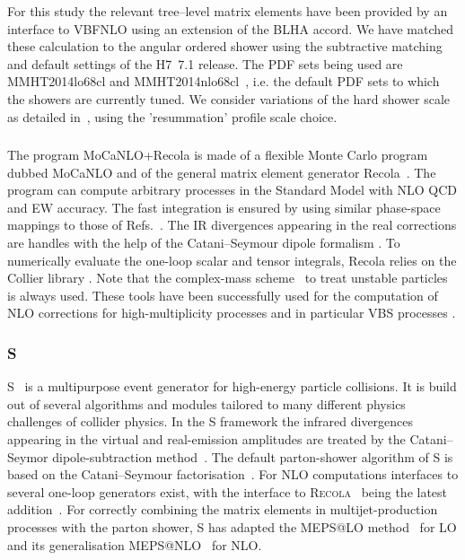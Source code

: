 \documentclass[11pt]{cernrep}
\newcommand{\Sherpa}{S\protect\scalebox{0.8}{HERPA}\xspace}
\newcommand{\Herwig}{H\protect\scalebox{0.8}{ERWIG}7\xspace}
\newcommand{\MoCaNLO}{M\protect\scalebox{0.8}{oCaNLO}\xspace}
\newcommand{\Recola}{R\protect\scalebox{0.8}{ecola}\xspace}
\begin{document}
For this study the relevant tree--level matrix elements have been
provided by an interface to VBFNLO using an extension of the BLHA
accord. We have matched these calculation to the angular ordered
shower using the subtractive matching and default settings of the
\Herwig~7.1 release. The PDF sets being used are MMHT2014lo68cl and
MMHT2014nlo68cl~\cite{Harland-Lang:2014zoa}, i.e. the default PDF sets
to which the showers are currently tuned. We consider variations of
the hard shower scale as detailed in~\cite{Bellm:2016rhh}, using the
'resummation' profile scale choice.

\subsubsection*{\protect{\MoCaNLO\!+\Recola} \label{vbs_MoCaNLO_Recola}}

The program {\sc MoCaNLO+Recola} is made of a flexible Monte Carlo program dubbed {\sc MoCaNLO} and of the general matrix element generator {\sc Recola}~\cite{Actis:2012qn,Actis:2016mpe}.
The program can compute arbitrary processes in the Standard Model with NLO QCD and EW accuracy.
The fast integration is ensured by using similar phase-space mappings to those of Refs.~\cite{Berends:1994pv,Denner:1999gp,Dittmaier:2002ap}.
The IR divergences appearing in the real corrections are handles with the help of the Catani--Seymour dipole formalism \cite{Catani:1996vz,Dittmaier:1999mb}.
To numerically evaluate the one-loop scalar and tensor integrals, {\sc Recola} relies on the {\sc Collier} library \cite{Denner:2014gla,Denner:2016kdg}.
Note that the complex-mass scheme~\cite{Denner:1999gp,Denner:2005fg} to treat unstable particles is always used.
These tools have been successfully used for the computation of NLO corrections for high-multiplicity processes and in particular VBS processes \cite{Biedermann:2016yds,Biedermann:2017bss}.

\subsubsection*{\protect\Sherpa \label{vbs_sherpa}}
\Sherpa~\cite{Gleisberg:2008ta,Gleisberg:2003xi} is a multipurpose event generator for high-energy particle collisions. 
It is build out of several algorithms and modules tailored to many different physics challenges of collider physics.
In the \Sherpa framework the infrared divergences appearing in the virtual and real-emission amplitudes are treated by the Catani--Seymor dipole-subtraction method~\cite{Catani:1996vz,Catani:2002hc,Gleisberg:2007md}. The default parton-shower algorithm of \Sherpa is based on the Catani--Seymour factorisation~\cite{Schumann:2007mg,Hoeche:2009xc}. For NLO computations interfaces to several one-loop generators exist, with the interface to \textsc{Recola}~\cite{Actis:2012qn,Actis:2016mpe} being the latest addition~\cite{Biedermann:2017yoi}. For correctly combining the matrix elements in multijet-production processes with the parton shower, \Sherpa has adapted the MEPS@LO method~\cite{Hoeche:2009rj} for LO and its generalisation MEPS@NLO~\cite{Hoche:2010kg} for NLO. 
\end{document}
